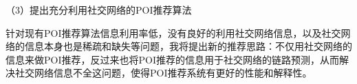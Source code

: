 \documentclass[a4paper,11pt]{article}
\theoremstyle{mytheor}
\begin{document}
（3）提出充分利用社交网络的POI推荐算法

针对现有POI推荐算法信息利用率低，没有良好的利用社交网络信息，以及社交网络的信息本身也是稀疏和缺失等问题，我将提出新的推荐思路：不仅用社交网络的信息来做POI推荐，反过来也将POI推荐的信息用于社交网络的链路预测，从而解决社交网络信息不全这问题，使得POI推荐系统有更好的性能和解释性。



\gEng



\end{document}
